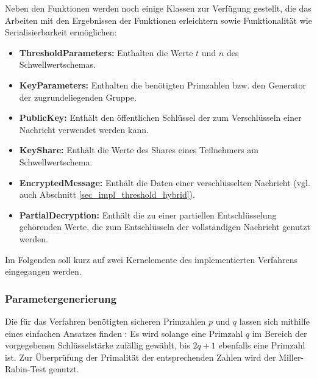 Neben den Funktionen werden noch einige Klassen zur Verfügung gestellt, die das Arbeiten mit den Ergebnissen der Funktionen erleichtern sowie Funktionalität wie Serialisierbarkeit ermöglichen:

\begin{itemize}
  \item \textbf{ThresholdParameters: } Enthalten die Werte \(t\) und \(n\) des Schwellwertschemas.
  \item \textbf{KeyParameters: } Enthalten die benötigten Primzahlen bzw. den Generator der zugrundeliegenden Gruppe.
  \item \textbf{PublicKey: } Enthält den öffentlichen Schlüssel der zum Verschlüsseln einer Nachricht verwendet werden kann.
  \item \textbf{KeyShare: } Enthält die Werte des Shares eines Teilnehmers am Schwellwertschema.
  \item \textbf{EncryptedMessage: } Enthält die Daten einer verschlüsselten Nachricht (vgl. auch Abschnitt \ref{sec_impl_threshold_hybrid}).
  \item \textbf{PartialDecryption: } Enthält die zu einer partiellen Entschlüsselung gehörenden Werte, die zum Entschlüsseln der vollständigen Nachricht genutzt werden.
\end{itemize}

Im Folgenden soll kurz auf zwei Kernelemente des implementierten Verfahrens eingegangen werden.

\subsubsection{Parametergenerierung}
  
 \label{sec_impl_threshold_keyparams}
  


Die für das Verfahren benötigten sicheren Primzahlen \(p\) und \(q\) lassen sich mithilfe eines einfachen Ansatzes finden \cite{hoc1996}: Es wird solange eine Primzahl \(q\) im Bereich der vorgegebenen Schlüsselstärke zufällig gewählt, bis \(2q + 1\) ebenfalls eine Primzahl ist. Zur Überprüfung der Primalität der entsprechenden Zahlen wird der Miller-Rabin-Test genutzt.

